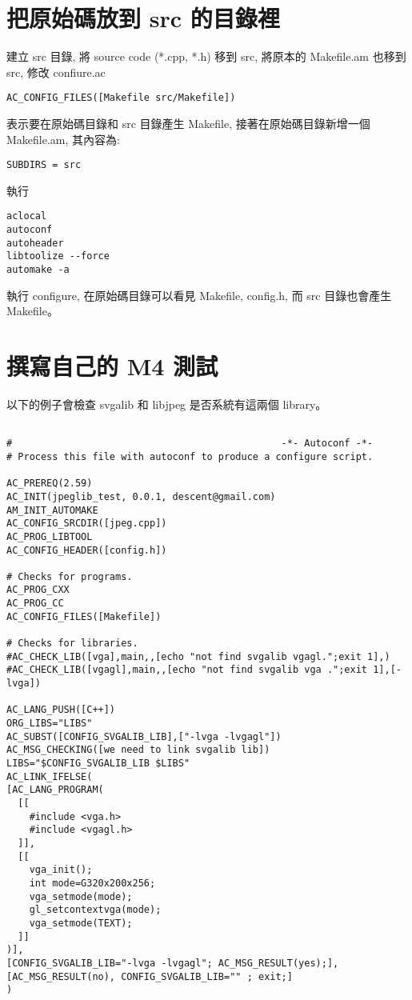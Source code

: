 \documentclass[12pt,a4]{article}
\begin{document}
\begin{CJK}{UTF8}{bsmi}
\section{把原始碼放到 src 的目錄裡}
建立 src 目錄, 將 source code (*.cpp, *.h) 移到 src,
將原本的 Makefile.am 也移到 src,
修改 confiure.ac


\begin{verbatim}
AC_CONFIG_FILES([Makefile src/Makefile])
\end{verbatim}

表示要在原始碼目錄和 src 目錄產生 Makefile,
接著在原始碼目錄新增一個 Makefile.am,
其內容為:

\begin{verbatim}
SUBDIRS = src
\end{verbatim}


執行
\begin{verbatim}
aclocal
autoconf
autoheader
libtoolize --force 
automake -a
\end{verbatim}

執行 configure,
在原始碼目錄可以看見 Makefile, config.h,
而 src 目錄也會產生 Makefile。


\section{撰寫自己的 M4 測試}
以下的例子會檢查 svgalib 和 libjpeg 是否系統有這兩個 library。
\begin{verbatim}

#                                               -*- Autoconf -*-
# Process this file with autoconf to produce a configure script.

AC_PREREQ(2.59)
AC_INIT(jpeglib_test, 0.0.1, descent@gmail.com)
AM_INIT_AUTOMAKE
AC_CONFIG_SRCDIR([jpeg.cpp])
AC_PROG_LIBTOOL
AC_CONFIG_HEADER([config.h])

# Checks for programs.
AC_PROG_CXX
AC_PROG_CC
AC_CONFIG_FILES([Makefile])

# Checks for libraries.
#AC_CHECK_LIB([vga],main,,[echo "not find svgalib vgagl.";exit 1],)
#AC_CHECK_LIB([vgagl],main,,[echo "not find svgalib vga .";exit 1],[-lvga])

AC_LANG_PUSH([C++])
ORG_LIBS="LIBS"
AC_SUBST([CONFIG_SVGALIB_LIB],["-lvga -lvgagl"])
AC_MSG_CHECKING([we need to link svgalib lib])
LIBS="$CONFIG_SVGALIB_LIB $LIBS"
AC_LINK_IFELSE(
[AC_LANG_PROGRAM(
  [[
    #include <vga.h>
    #include <vgagl.h>
  ]],
  [[
    vga_init();
    int mode=G320x200x256;
    vga_setmode(mode);
    gl_setcontextvga(mode);
    vga_setmode(TEXT);
  ]]
)],
[CONFIG_SVGALIB_LIB="-lvga -lvgagl"; AC_MSG_RESULT(yes);],
[AC_MSG_RESULT(no), CONFIG_SVGALIB_LIB="" ; exit;]
)


\end{verbatim}
\end{CJK}
\end{document}
